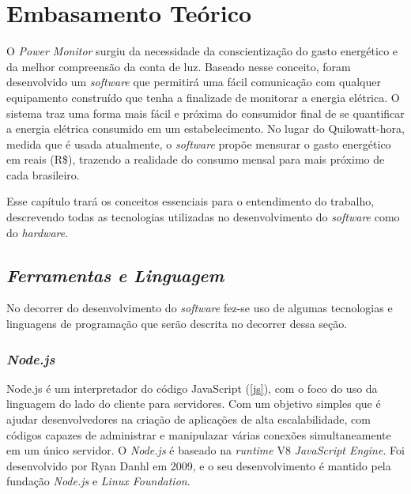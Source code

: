 \chapter[Embasamento Teórico]{Embasamento Teórico}
\label{ch:cap2}
O \textit{Power Monitor} surgiu da necessidade da conscientização do gasto energético e da melhor compreensão da conta de luz. Baseado nesse conceito,
foram desenvolvido um \textit{software} que permitirá uma fácil comunicação com qualquer equipamento construído que tenha a finalizade de monitorar a energia elétrica.
O sistema traz uma forma mais fácil e próxima do consumidor final de se quantificar a energia elétrica consumido em um estabelecimento. No lugar do Quilowatt-hora, medida que é usada atualmente,
o \textit{software} propõe mensurar o gasto energético em reais (R\$), trazendo a realidade do consumo mensal para mais próximo de cada brasileiro.

Esse capítulo trará os conceitos essenciais para o entendimento do trabalho, descrevendo todas as tecnologias utilizadas no desenvolvimento 
do \textit{software} como do \textit{hardware}.

\section[\textit{Ferramentas e Linguagem}]{\textit{Ferramentas e Linguagem}}\label{ferramenta-linguagem}
No decorrer do desenvolvimento do \textit{software} fez-se uso de algumas tecnologias e linguagens de programação que serão descrita no decorrer
dessa seção.
\subsection[\textit{Node.js}]{\textit{Node.js}}\label{node}
Node.js é um interpretador do código JavaScript (\autoref{js}), com o foco do uso da linguagem do lado do cliente para servidores. Com um objetivo simples
que é ajudar desenvolvedores na criação de aplicações de alta escalabilidade, com códigos capazes de administrar e manipulazar várias conexões simultaneamente
em um único servidor. O \textit{Node.js} é baseado na \textit{runtime} V8 \textit{JavaScript Engine}. Foi desenvolvido por Ryan Danhl em 2009, e o seu desenvolvimento
é mantido pela fundação \textit{Node.js} e \textit{Linux Foundation}. 

